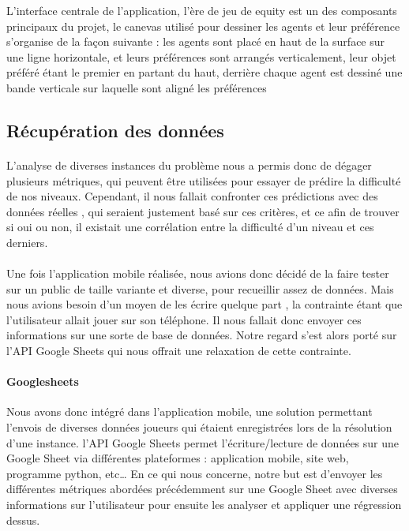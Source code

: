 \documentclass[../main.tex]{subfiles}
\begin{document}
L'interface centrale de  l'application, l'ère de jeu de equity est un des composants principaux du projet, le canevas utilisé pour dessiner les agents et leur préférence s'organise de la façon suivante : les agents sont placé en haut de la surface sur une ligne horizontale, et leurs préférences sont arrangés verticalement, leur objet préféré étant le premier en partant du haut, derrière chaque agent est dessiné une bande verticale sur laquelle sont aligné les préférences 


	\subsection{Récupération des données}
	
	\paragraph{}
	L’analyse de diverses instances du problème nous a permis donc de dégager plusieurs métriques, qui peuvent être utilisées pour essayer de prédire la difficulté de nos niveaux. Cependant, il nous fallait confronter ces prédictions avec des données réelles , qui seraient justement basé sur ces critères, et ce afin de trouver si oui ou non, il existait une corrélation entre la difficulté d’un niveau et ces derniers. 
	\paragraph{}
Une fois l’application mobile réalisée, nous avions donc décidé de la faire tester sur un public de taille variante et diverse, pour recueillir assez de données. Mais nous avions besoin d’un moyen de les écrire quelque part , la contrainte étant que l’utilisateur allait jouer sur son téléphone. Il nous fallait donc envoyer ces informations sur une sorte de base de données. Notre regard s’est alors porté sur l’API Google Sheets qui nous offrait une relaxation de cette contrainte.

\paragraph{Googlesheets}
Nous avons donc intégré dans l’application mobile, une solution permettant l’envois de diverses données joueurs qui étaient enregistrées lors de la résolution d’une instance. l’API Google Sheets permet l’écriture/lecture de données sur une Google Sheet via différentes plateformes : application mobile, site web, programme python, etc… 
En ce qui nous concerne, notre but est d’envoyer les différentes métriques abordées précédemment sur une Google Sheet avec diverses informations sur l’utilisateur pour ensuite les analyser et appliquer une régression dessus.
\end{document}
